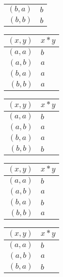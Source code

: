 \begin{enumerate}[label={\Alph*.},font={\bfseries}]
\begin{enumerate}[label={\arabic*},font={\bfseries}]
\begin{minipage}[h]{.25\textwidth}
\begin{tabular}{ r | l }
            $(b,a)$ & $b$ \\
            $(b,b)$ & $b$
          \end{tabular}
        \end{minipage}
        \begin{minipage}[h]{.25\textwidth}
          \begin{tabular}{ r | l }
            $(x,y)$ & $x*y$ \\
            \hline
            $(a,a)$ & $b$ \\
            $(a,b)$ & $a$ \\
            $(b,a)$ & $a$ \\
            $(b,b)$ & $a$
          \end{tabular}
        \end{minipage}
        \begin{minipage}[h]{.25\textwidth}
          \begin{tabular}{ r | l }
            $(x,y)$ & $x*y$ \\
            \hline
            $(a,a)$ & $b$ \\
            $(a,b)$ & $a$ \\
            $(b,a)$ & $a$ \\
            $(b,b)$ & $b$
          \end{tabular}
        \end{minipage}
        \begin{minipage}[h]{.25\textwidth}
          \begin{tabular}{ r | l }
            $(x,y)$ & $x*y$ \\
            \hline
            $(a,a)$ & $b$ \\
            $(a,b)$ & $a$ \\
            $(b,a)$ & $b$ \\
            $(b,b)$ & $a$
          \end{tabular}
        \end{minipage}
        \begin{minipage}[h]{.25\textwidth}
          \begin{tabular}{ r | l }
            $(x,y)$ & $x*y$ \\
            \hline
            $(a,a)$ & $b$ \\
            $(a,b)$ & $a$ \\
            $(b,a)$ & $b$ \\

\end{tabular}
\end{minipage}
\end{enumerate}
\end{enumerate}
